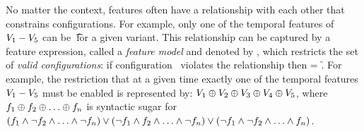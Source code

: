 No matter the context, features often have a relationship with each other that
constrains configurations. For example, only one of the temporal features of $\vOne - \vFive$
can be \t\ for a given variant.
This relationship can be captured by a feature expression, called a \emph{feature model} and
denoted by \fModel,
which restricts the set of \emph{valid configurations}:
if configuration \config\ violates the relationship then 
\fSem \fModel = \f.
For example, the restriction that at a given time exactly one of the temporal features $\vOne - \vFive$
must be enabled is represented by:
\ensuremath{
\vOne \oplus \vTwo \oplus \vThree \oplus \vFour \oplus \vFive
},
where $\A \oplus \B \oplus \ldots \oplus \fName_n$ is syntactic sugar for $(\A \wedge \neg \B \wedge \ldots \wedge \neg \fName_n) \vee (\neg \A \wedge \B \wedge \ldots \wedge \neg \fName_n) \vee (\neg \A \wedge \neg \B \wedge \ldots \wedge \fName_n)$.





